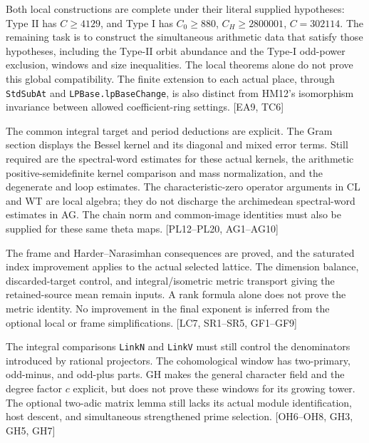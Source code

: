 \documentclass[11pt,a4paper]{article}
\numberwithin{equation}{section}
\theoremstyle{remark}\newtheorem{remark}[theorem]{Remark}
\begin{document}
\begin{description}[style=nextline]
\item[Supply the actual local data globally.]
Both local constructions are complete under their literal supplied
hypotheses: Type II has $C\ge4129$, and Type I has
$C_0\ge880$, $C_H\ge2800001$, $C=302114$.
The remaining task is to construct the simultaneous arithmetic data
that satisfy those hypotheses, including the Type-II orbit abundance
and the Type-I odd-power exclusion, windows and size inequalities.
The local theorems alone do not prove this global compatibility.
The finite extension to each actual place, through
\texttt{StdSubAt} and \texttt{LPBase.lpBaseChange}, is also
distinct from HM12's isomorphism invariance between allowed
coefficient-ring settings.
\textsf{[EA9, TC6]}

\item[Theta identities, spectral estimates, and arithmetic kernel normalization.]
The common integral target and period deductions are explicit. The Gram section displays the Bessel kernel and its diagonal and mixed error terms. Still required are the spectral-word estimates for these actual kernels, the arithmetic positive-semidefinite kernel comparison and mass normalization, and the degenerate and loop estimates. The characteristic-zero operator arguments in CL and WT are local algebra; they do not discharge the archimedean spectral-word estimates in AG. The chain norm and common-image identities must also be supplied for these same theta maps. \textsf{[PL12--PL20, AG1--AG10]}

\item[Actual dimensions, metrics, and discarded target directions.]
The frame and Harder--Narasimhan consequences are proved, and the saturated index improvement applies to the actual selected lattice. The dimension balance, discarded-target control, and integral/isometric metric transport giving the retained-source mean remain inputs. A rank formula alone does not prove the metric identity. No improvement in the final exponent is inferred from the optional local or frame simplifications. \textsf{[LC7, SR1--SR5, GF1--GF9]}

\item[Congruence denominators and cohomological windows.]
The integral comparisons \texttt{LinkN} and \texttt{LinkV} must still control the denominators introduced by rational projectors. The cohomological window has two-primary, odd-minus, and odd-plus parts. GH makes the general character field and the degree factor $c$ explicit, but does not prove these windows for its growing tower. The optional two-adic matrix lemma still lacks its actual module identification, host descent, and simultaneous strengthened prime selection. \textsf{[OH6--OH8, GH3, GH5, GH7]}


\end{description}
\end{document}
